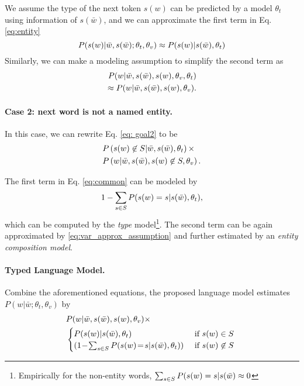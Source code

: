 \documentclass[11pt,a4paper]{article}
\begin{document}
We assume the type of the next token $s(w)$ can be predicted by a model $\theta_t$ using information of $s(\bar{w})$, and we can approximate the first term in Eq. \eqref{eq:entity} 
\begin{equation}\label{eq:approx_assumption}
    P(s(w)|\Bar{w},s(\Bar{w}); \theta_t, \theta_v) \approx P(s(w)|s(\Bar{w}), \theta_t)
\end{equation}
Similarly, we can make a modeling assumption to simplify the second term as 
\begin{equation}\label{eq:var_approx_assumption}
\begin{split}
P(w|\Bar{w},s(\Bar{w}), s(w), \theta_v, \theta_t) \\ \approx  P(w|\Bar{w}, s(\bar{w}), s(w), \theta_v).
\end{split}
\end{equation}


\paragraph{\bf Case 2: next word is not a named entity.}  In this case, we can rewrite Eq. \eqref{eq: goal2} to be
\begin{equation}
\label{eq:common}
    \begin{split}
  &  P\left(s(w) \not \in S|\Bar{w},  s(\bar{w}), \theta_t \right) \times\\
 & P\left(w|\Bar{w}, s(\Bar{w}), s(w) \not \in S, \theta_v \right).
 \end{split}
\end{equation}

The first term in Eq. \eqref{eq:common} can be modeled by 
\begin{equation*}
1- \sum_{s \in S} P(s(w) = s | s(\Bar{w}), \theta_t),
\end{equation*}
which can be computed by the {\it type} model\footnote{Empirically for the non-entity words, $\sum_{s \in S} P(s(w) = s | s(\Bar{w}) \approx 0$}. 
The second term can be again approximated by \eqref{eq:var_approx_assumption} and further estimated by an {\it entity composition model}.



\paragraph{\bf Typed Language Model.} Combine the aforementioned equations, the proposed language model estimates $P(w| \bar{w}; \theta_t, \theta_v)$ by 
\begin{equation}
\label{eq:combine}
\begin{split}
&P(w|\Bar{w}, s(\bar{w}), s(w), \theta_v) \times\\
&  \begin{cases}
 P(s(w)|s(\Bar{w}), \theta_t) 
 \  &\text{if $s(w)  \in S$ } \\
 (1\!-\!\sum_{s \in S} P(s(w)\!=\! s | s(\Bar{w}), \theta_t)) \  &
 \text{if $s(w)  \not \in S$ } \\
  \end{cases}  
  \end{split}
\end{equation}
\end{document}
